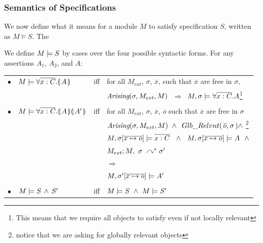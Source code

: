 \label{sec:adapt:motivate}




\subsubsection{ Semantics of \SpecLang Specifications}
We now  define what it means for  a module  $M$ to satisfy specification  $S$, written as $M \vDash S$. The
 
\begin{definition}%

We define $M \models {S}$ by cases over the four possible syntactic forms.
For any assertions   $A_1$, $A_2$, and $A$: \\

\label{def:necessity-semantics}

\begin{tabular}{l l c l }

$\bullet$ & $M \models \forall {\overline {x:C}}.{\llparenthesis}\, A \,{\rrparenthesis} 	$& iff & 
for all $M_{ext}$, $\sigma$, $\overline{x}$, such that $\overline{x}$  are free in $\sigma$, \\
  & & & $ \textit{Arising}(\sigma, M_{ext}, M)$ %
$ \ \Longrightarrow \  $  %
{$ M , \sigma \models \forall \overline{x:C}.A$}\footnote{{This means that we require all objects to satisfy even if not locally relevant}}
\\
\\
$\bullet$ & $M \models \forall {\overline {x:C}}.{\llparenthesis}\, A \,{\rrparenthesis}{\llparenthesis}\, A' \,{\rrparenthesis}$& iff & 
for all $M_{ext}$, $\sigma$, $\overline{x}$, $\overline{o}$ such that $\overline{x}$  are free in $\sigma$  \\
& & &
$\textit{Arising}(\sigma, M_{ext}, M) \ \wedge\  \,Glb\_Relvnt(\,\overline o,\sigma\,) \wedge \ $\footnote{{notice that we are asking for globally relevant objects}}\\
& & & $ \satisfiesA{M}{\sigma[\overline{x\mapsto o}]}{\overline {x:C}}  \ \ \wedge\ \  \satisfiesA{M}{\sigma[\overline{x\mapsto o}]}{A} \ \ \wedge$ \\ 
& & &
$M_{ext} ; M,\ \sigma\ \curvearrowright^* \sigma'  $ \\
& & & $ \Longrightarrow $ \\
& & & $ M , \sigma'[\overline{x\mapsto o}] \models A' $
\\
\\
$\bullet$ &  $M \models S\, \wedge\, S'$ &   iff   & $\satisfies{M}{S}\ \wedge \ \satisfies{M}{S'}$
\end{tabular} 

 
\end{definition} 

